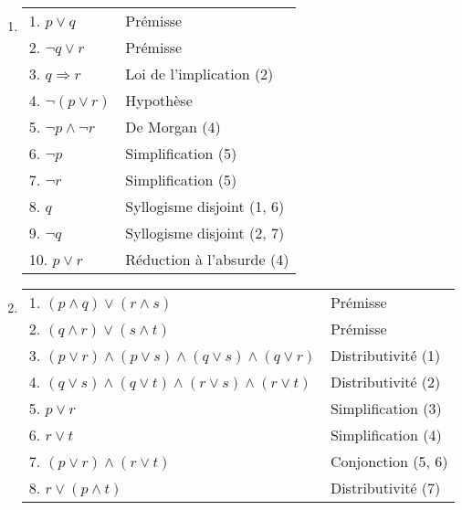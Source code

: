 \begin{enumerate}
	\item  \hspace{1em}
    \begin{center}
    \begin{tabular}{|l|l|}
    \hline
    1. $p \lor q$ & Prémisse \\
    2. $\lnot q \lor r$ & Prémisse \\
    3. $q \Rightarrow r$ & Loi de l'implication (2) \\
    \hspace{0.5cm} 4. $\lnot(p \lor r)$ & Hypothèse \\
    \hspace{0.5cm} 5. $\lnot p \land \lnot r$ & De Morgan (4) \\ 
    \hspace{0.5cm} 6. $\lnot p$ & Simplification (5) \\
    \hspace{0.5cm} 7. $\lnot r$ & Simplification (5) \\
    \hspace{0.5cm} 8. $q$ & Syllogisme disjoint (1, 6) \\
    \hspace{0.5cm} 9. $\lnot q$ & Syllogisme disjoint (2, 7) \\
    10. $p \lor r$ & Réduction à l'absurde (4)\\
    \hline
    \end{tabular}
    \end{center}
    
	\item  \hspace{1em}
    \begin{center}
    \begin{tabular}{|l|l|}
    \hline
    1. $(p \land q) \lor (r \land s)$ & Prémisse \\
    2. $(q \land r) \lor (s \land t)$ & Prémisse \\
    3. $(p \lor r) \land (p \lor s) \land (q \lor s) \land (q \lor r)$ & Distributivité (1) \\
    4. $(q \lor s) \land (q \lor t) \land (r \lor s) \land (r \lor t)$ & Distributivité (2) \\
    5. $p \lor r$ & Simplification (3) \\ 
    6. $r \lor t$ & Simplification (4) \\ 
    7. $(p \lor r) \land (r \lor t)$ & Conjonction (5, 6) \\ 
    8. $r \lor (p \land t)$ & Distributivité (7) \\ 
    \hline
    \end{tabular}
    \end{center}
\end{enumerate}

